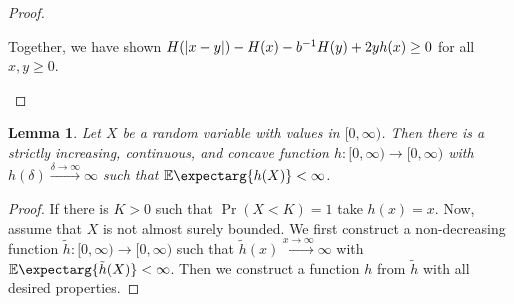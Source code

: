 \documentclass{scrartcl}
\newcommand{\Prof}[1]{\Pr(#1)}
\newcommand{\Ex}{\E\expectarg}
\theoremstyle{plain}\newtheorem{theorem}{Theorem}[section]
\newtheorem{lemma}[theorem]{Lemma}
\theoremstyle{definition}
\theoremstyle{remark}
\begin{document}
\begin{appendix}
\begin{proof}
\begin{enumerate}[label=(\roman*)]
	Together, we have shown $H(\left| x-y \right|) - H(x) - b^{-1} H(y) + 2 y h(x) \geq 0$ for all $x,y\geq0$.
\end{enumerate}
\end{proof}
\begin{lemma}\label{lmm:nondec:existence}
	Let $X$ be a random variable with values in $[0,\infty)$. Then there is a strictly increasing, continuous, and concave function $h \colon [0,\infty) \to [0,\infty)$ with $h(\delta)\xrightarrow{\delta\to\infty}\infty$ such that $\Ex{h(X)} < \infty$.
\end{lemma}
\begin{proof}
	If there is $K > 0$ such that $\Prof{X < K} = 1$ take $h(x) = x$. Now, assume that $X$ is not almost surely bounded.
	We first construct a non-decreasing function $\tilde h \colon [0,\infty) \to [0,\infty)$ such that $\tilde h (x) \xrightarrow{x\to\infty}\infty$ with $\Ex{\tilde h(X)} < \infty$.
	Then we construct a function $h$ from $\tilde h$ with all desired properties.


\end{proof}
\end{appendix}
\end{document}
